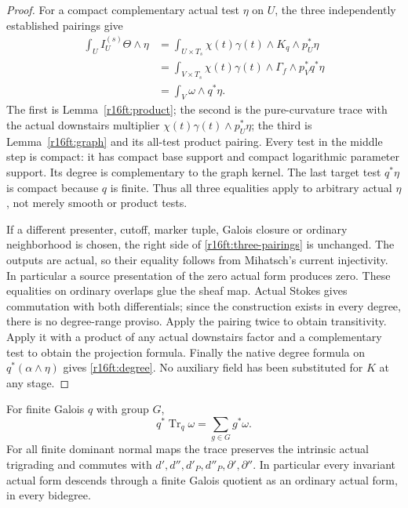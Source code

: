 \begin{proof}
For a compact complementary actual test $\eta$ on $U$, the three
independently established pairings give
\[
\begin{split}
 \int_U I^{(s)}_U\Theta\wedge\eta
 &=\int_{U\times T_s}\chi(t)\gamma(t)\wedge K_q\wedge p_U^*\eta\\
 &=\int_{V\times T_s}\chi(t)\gamma(t)\wedge\Gamma_f
                                      \wedge p_V^*q^*\eta\\
 &=\int_V\omega\wedge q^*\eta.
\end{split}
 \tag{FT16.13}\label{r16ft:three-pairings}
\]
The first is Lemma~\ref{r16ft:product}; the second is the
pure-curvature trace with the actual downstairs multiplier
$\chi(t)\gamma(t)\wedge p_U^*\eta$; the third is
Lemma~\ref{r16ft:graph} and its all-test product pairing.
Every test in the middle step is compact: it has compact base support
and compact logarithmic parameter support. Its degree is complementary
to the graph kernel. The last target test $q^*\eta$ is compact because
$q$ is finite. Thus all three equalities apply to arbitrary actual
$\eta$, not merely smooth or product tests.

If a different presenter, cutoff, marker tuple, Galois closure or
ordinary neighborhood is chosen, the right side of
\eqref{r16ft:three-pairings} is unchanged. The outputs are actual,
so their equality follows from Mihatsch's current injectivity. In
particular a source presentation of the zero actual form produces
zero. These equalities on ordinary overlaps glue the sheaf map.
Actual Stokes gives commutation with both differentials; since the
construction exists in every degree, there is no degree-range proviso.
Apply the pairing twice to obtain transitivity. Apply it with a
product of any actual downstairs factor and a complementary test to
obtain the projection formula. Finally the native degree formula on
$q^*(\alpha\wedge\eta)$ gives \eqref{r16ft:degree}. No auxiliary field
has been substituted for $K$ at any stage.
\end{proof}

\begin{corollary}
\label{r16ft:orbit}
For finite Galois $q$ with group $G$,
\[
 q^*\operatorname{Tr}_q\omega=\sum_{g\in G}g^*\omega.
 \tag{FT16.14}\label{r16ft:orbit-formula}
\]
For all finite dominant normal maps the trace preserves the intrinsic
actual trigrading and commutes with
$d',d'',d'_P,d''_P,\partial',\partial''$.
In particular every invariant actual form descends through a finite
Galois quotient as an ordinary actual form, in every bidegree.
\end{corollary}


